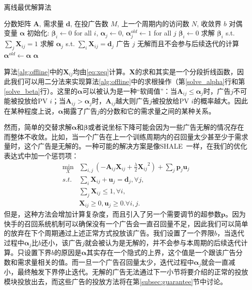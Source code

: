 \begin{algorithm}[tb]
	\caption{离线最优解算法} 
	\label{alg:offline}
	\begin{algorithmic}[1]
		\REQUIRE 分数矩阵 $\bm{A}$, 需求量 $\bm{d}$, 在投广告数 $M$, 上一个周期内的访问数 $N$, 收敛界 $b$
		\ENSURE 对偶变量 $\bm{\alpha}$ 
		\STATE 初始化: $\bm{\beta}_i \leftarrow 0$ for all $i$, $\bm{\alpha}_j \leftarrow 0$, $\bm{\alpha}^{old}_j \leftarrow 1$ for all $j$
		\STATE $\bm{\beta}_i \leftarrow 0$
		\ELSE
		\STATE 求解 $\bm{\beta}_i$ s.t. $\sum_j \bm{X}_{ij} = 1$ \label{solve_beta}
		\ENDIF
		\ENDFOR
		\STATE 求解 $\bm{\alpha}_j$ s.t. $\sum_i \bm{X}_{ij} = \bm{d}_j$ \label{solve_alpha}
		\STATE 广告 $j$ 无解而且不会参与后续迭代的计算 \label{bound}
		\ENDIF
		\ENDFOR
		\STATE $\bm{\alpha}^{old} \leftarrow \bm{\alpha}$
		\ENDWHILE
		\RETURN $\bm{\alpha}$ 
	\end{algorithmic}
\end{algorithm}

算法\ref{alg:offline}中的$\bm{X}_{ij}$均由\eqref{eq:xeq}计算。$\bm{X}$的求和其实是一个分段折线函数，因此我们可以用二分法来实现算法\ref{alg:offline}中的求根操作（第\ref{solve_alpha}行和第\ref{solve_beta}行）。这里的$\bm{\alpha}$可以被认为是一种“软阈值”：当$\bm{A}_{ij} \le \bm{\alpha}_j$时，广告$j$不可能被投放给PV $i$；当$\bm{A}_{ij} > \bm{\alpha}_j$时，$\bm{A}_{ij}$越大则广告$j$被投放给PV $i$的概率越大。因此在某种程度上说，$\bm{\alpha}$揭露了广告$j$的分数和它的需求量之间的某种关系。

然而，简单的交替求解$\bm{\alpha}$和$\bm{\beta}$或者说坐标下降可能会因为一些广告无解的情况存在而整体不收敛。比如，当一个广告在上一个训练周期内的召回量太少甚至少于需求量时，这个广告是无解的。一种可能的解决方案是像SHALE~\cite{bharadwaj2012shale}一样，在我们的优化表达式中加一个惩罚项：
\begin{equation}
\begin{aligned}
\min_X &\sum_{i,j}  (-\bm{A}_{ij}\bm{X}_{ij} + \frac{\lambda}{2}{\bm{X}_{ij}}^2) + \sum_j \bm{p}_j\bm{u}_j  \\
s.t. & \sum_i \bm{X}_{ij} + \bm{u}_j = \bm{d}_j, \forall j, \\
& \sum_j \bm{X}_{ij} \le 1, \forall i, \\
& \bm{X}_{ij} \ge 0, \bm{u}_j \ge 0. \forall i, j. 
\end{aligned}
\end{equation}
但是，这种方法会增加计算复杂度，而且引入了另一个需要调节的超参数$\bm{p}$。因为快手的召回系统机制可以确保没有一个广告会一直召回量不足，因此我们可以简单的放弃在下个周期通过上述正常方式投放该广告。我们设置了一个界限$b$，当迭代过程中$\bm{\alpha}_j$比$b$还小，该广告$j$就会被认为是无解的，并不会参与本周期的后续迭代计算。只设置下界$b$的原因是$\bm{\alpha}$其实存在一个隐式的上界，这个值是一个跟该广告分数和需求量相关的值。而一旦一个广告召回量太少，迭代过程中$\bm{\alpha}_j$就会一直减小，最终触发下界停止迭代。无解的广告无法通过下一小节将要介绍的正常的投放模块投放出去，而这些广告的投放方法将在第\ref{subsec:guarantee}节中讨论。

